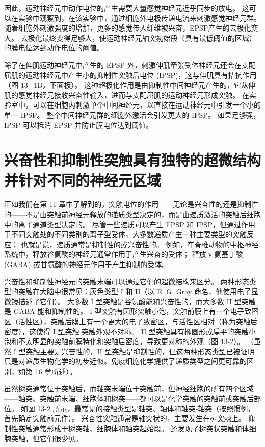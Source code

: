 因此，运动神经元中动作电位的产生需要大量感觉神经元近乎同步的放电。 这可以在实验中观察到，在该实验中，通过细胞外电极传递电流来刺激感觉神经元群。 随着细胞外刺激强度的增加，更多的感觉传入纤维被兴奋，EPSP产生的去极化变大。 去极化最终变得足够大，使运动神经元轴突初始段（具有最低阈值的区域）的膜电位达到动作电位的阈值。

除了在伸肌运动神经元中产生的 EPSP 外，刺激伸肌牵张受体神经元还会在支配屈肌的运动神经元中产生小的抑制性突触后电位 (IPSP)，这与伸肌具有拮抗作用（图 13– 1B，下面板）。 这种超极化作用是由抑制性中间神经元产生的，它从伸肌的感觉神经元接收兴奋性输入，进而与支配屈肌的运动神经元形成突触。 在实验室中，可以在细胞内刺激单个中间神经元，以直接在运动神经元中引发一个小的单一 IPSP。 整个中间神经元群的细胞外激活会引发更大的 IPSP。 如果足够强，IPSP 可以抵消 EPSP 并防止膜电位达到阈值。


\section{兴奋性和抑制性突触具有独特的超微结构并针对不同的神经元区域}
正如我们在第 11 章中了解到的，突触电位的作用——无论是兴奋性的还是抑制性的——不是由突触前神经元释放的递质类型决定的，而是由递质激活的突触后细胞中的离子通道类型决定的。 尽管一些递质可以产生 EPSP 和 IPSP，但通过作用于不同突触处的不同类别的离子型受体，大多数递质产生一种主要类型的突触反应； 也就是说，递质通常是抑制性的或兴奋性的。 例如，在脊椎动物的中枢神经系统中，释放谷氨酸的神经元通常作用于产生兴奋的受体； 释放 γ-氨基丁酸 (GABA) 或甘氨酸的神经元作用于产生抑制的受体。

兴奋性和抑制性神经元的突触末端可以通过它们的超微结构来区分。 两种形态类型的突触在大脑中很常见：灰色类型 I 和 II（以 E. G. Gray 命名，他使用电子显微镜描述了它们）。 大多数 I 型突触是谷氨酸能和兴奋性的，而大多数 II 型突触是 GABA 能和抑制性的。 I 型突触有圆形突触小泡，突触前膜上有一个电子致密区（活性区），突触后膜上有一个更大的电子致密区，与活性区相对（称为突触后密度），这使得 I 型突触 突触外观不对称。 II 型突触具有椭圆形或扁平的突触小泡和不太明显的突触前膜特化和突触后密度，导致更对称的外观（图 13-2）。 （虽然 I 型突触主要是兴奋性的，II 型突触是抑制性的，但这两种形态类型已被证明只是对递质生物化学的初步近似。免疫细胞化学提供了递质类型之间更可靠的区别，如第 16 章所述）。

虽然树突通常位于突触后，而轴突末端位于突触前，但神经细胞的所有四个区域——轴突、突触前末端、细胞体和树突——都可以是化学突触的突触前或突触后部位。 如图 13-2 所示，最常见的接触类型是轴突、轴体和轴突-轴突（按照惯例，首先确定突触前元件）。 兴奋性突触通常是轴突状的，主要发生在树突棘上。 抑制性突触通常形成于树突轴、细胞体和轴突起始段。 还发现了树突状突触和体细胞突触，但它们很少见。

